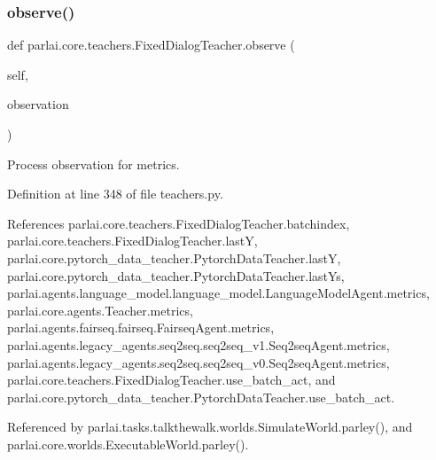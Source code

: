 \subsubsection{\texorpdfstring{observe()}{observe()}}
{\footnotesize\ttfamily def parlai.\+core.\+teachers.\+Fixed\+Dialog\+Teacher.\+observe (\begin{DoxyParamCaption}\item[{}]{self,  }\item[{}]{observation }\end{DoxyParamCaption})}

\begin{DoxyVerb}Process observation for metrics.\end{DoxyVerb}
 

Definition at line 348 of file teachers.\+py.



References parlai.\+core.\+teachers.\+Fixed\+Dialog\+Teacher.\+batchindex, parlai.\+core.\+teachers.\+Fixed\+Dialog\+Teacher.\+lastY, parlai.\+core.\+pytorch\+\_\+data\+\_\+teacher.\+Pytorch\+Data\+Teacher.\+lastY, parlai.\+core.\+pytorch\+\_\+data\+\_\+teacher.\+Pytorch\+Data\+Teacher.\+last\+Ys, parlai.\+agents.\+language\+\_\+model.\+language\+\_\+model.\+Language\+Model\+Agent.\+metrics, parlai.\+core.\+agents.\+Teacher.\+metrics, parlai.\+agents.\+fairseq.\+fairseq.\+Fairseq\+Agent.\+metrics, parlai.\+agents.\+legacy\+\_\+agents.\+seq2seq.\+seq2seq\+\_\+v1.\+Seq2seq\+Agent.\+metrics, parlai.\+agents.\+legacy\+\_\+agents.\+seq2seq.\+seq2seq\+\_\+v0.\+Seq2seq\+Agent.\+metrics, parlai.\+core.\+teachers.\+Fixed\+Dialog\+Teacher.\+use\+\_\+batch\+\_\+act, and parlai.\+core.\+pytorch\+\_\+data\+\_\+teacher.\+Pytorch\+Data\+Teacher.\+use\+\_\+batch\+\_\+act.



Referenced by parlai.\+tasks.\+talkthewalk.\+worlds.\+Simulate\+World.\+parley(), and parlai.\+core.\+worlds.\+Executable\+World.\+parley().

